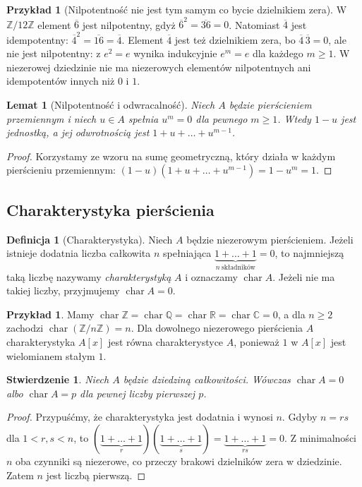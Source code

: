 \documentclass[11pt,a4paper,openany]{report}
\numberwithin{equation}{section}
\theoremstyle{plain}
\newtheorem{lemat}[twierdzenie]{Lemat}
\newtheorem{stwierdzenie}[twierdzenie]{Stwierdzenie}
\theoremstyle{definition}
\newtheorem{definicja}[twierdzenie]{Definicja}
\newtheorem{przyklad}[twierdzenie]{Przykład}
\theoremstyle{remark}
\newcommand{\Z}{\mathbb Z}
\newcommand{\Q}{\mathbb Q}
\newcommand{\R}{\mathbb R}
\newcommand{\C}{\mathbb C}
\begin{document}
\begin{przyklad}[Nilpotentność nie jest tym samym co bycie dzielnikiem zera]
W $\Z/12\Z$ element $\overline6$ jest nilpotentny,
gdyż $\overline6^2=\overline{36}=0$.
Natomiast $\overline4$ jest idempotentny:
$\overline4^2=\overline{16}=\overline4$.
Element $\overline4$ jest też dzielnikiem zera, bo
$\overline4\,\overline3=0$, ale nie jest nilpotentny:
z $e^2=e$ wynika indukcyjnie $e^m=e$ dla każdego $m\ge1$.
W niezerowej dziedzinie nie ma niezerowych elementów nilpotentnych
ani idempotentów innych niż $0$ i $1$.
\end{przyklad}

\begin{lemat}[Nilpotentność i odwracalność]
Niech $A$ będzie pierścieniem przemiennym i niech $u\in A$ spełnia
$u^m=0$ dla pewnego $m\ge1$. Wtedy $1-u$ jest jednostką, a jej
odwrotnością jest $1+u+\dots+u^{m-1}$.
\end{lemat}
\begin{proof}
Korzystamy ze wzoru na sumę geometryczną, który działa w każdym
pierścieniu przemiennym:
$(1-u)(1+u+\dots+u^{m-1})=1-u^m=1$.
\end{proof}


\subsection{Charakterystyka pierścienia}

\begin{definicja}[Charakterystyka]
Niech $A$ będzie niezerowym pierścieniem.
Jeżeli istnieje dodatnia liczba całkowita $n$ spełniająca
$\underbrace{1+\dots+1}_{n\ \text{składników}}=0$,
to najmniejszą taką liczbę nazywamy \emph{charakterystyką} $A$
i oznaczamy $\operatorname{char}A$.
Jeżeli nie ma takiej liczby, przyjmujemy $\operatorname{char}A=0$.
\end{definicja}

\begin{przyklad}
Mamy $\operatorname{char}\Z=\operatorname{char}\Q
=\operatorname{char}\R=\operatorname{char}\C=0$,
a dla $n\ge2$ zachodzi $\operatorname{char}(\Z/n\Z)=n$.
Dla dowolnego niezerowego pierścienia $A$ charakterystyka $A[x]$ jest równa
charakterystyce $A$, ponieważ $1$ w $A[x]$ jest wielomianem stałym $1$.
\end{przyklad}

\begin{stwierdzenie}
Niech $A$ będzie dziedziną całkowitości. Wówczas
$\operatorname{char}A=0$ albo $\operatorname{char}A=p$
dla pewnej liczby pierwszej $p$.
\end{stwierdzenie}
\begin{proof}
Przypuśćmy, że charakterystyka jest dodatnia i wynosi $n$.
Gdyby $n=rs$ dla $1<r,s<n$, to
$(\underbrace{1+\dots+1}_{r})(\underbrace{1+\dots+1}_{s})
=\underbrace{1+\dots+1}_{rs}=0$.
Z minimalności $n$ oba czynniki są niezerowe, co przeczy
brakowi dzielników zera w dziedzinie. Zatem $n$ jest liczbą pierwszą.
\end{proof}
\end{document}
